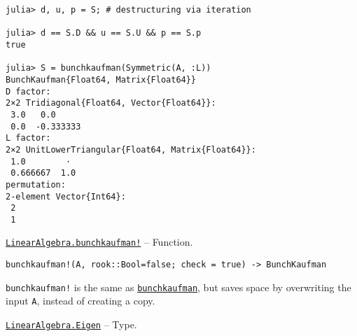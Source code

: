 \begin{adjustwidth}{2em}{0pt}
\begin{verbatim}
julia> d, u, p = S; # destructuring via iteration

julia> d == S.D && u == S.U && p == S.p
true

julia> S = bunchkaufman(Symmetric(A, :L))
BunchKaufman{Float64, Matrix{Float64}}
D factor:
2×2 Tridiagonal{Float64, Vector{Float64}}:
 3.0   0.0
 0.0  -0.333333
L factor:
2×2 UnitLowerTriangular{Float64, Matrix{Float64}}:
 1.0        ⋅
 0.666667  1.0
permutation:
2-element Vector{Int64}:
 2
 1
\end{verbatim}



\end{adjustwidth}
\hypertarget{12377977453211508613}{}
\hyperlink{12377977453211508613}{\texttt{LinearAlgebra.bunchkaufman!}}  -- {Function.}

\begin{adjustwidth}{2em}{0pt}


\begin{verbatim}
bunchkaufman!(A, rook::Bool=false; check = true) -> BunchKaufman
\end{verbatim}

\texttt{bunchkaufman!} is the same as \hyperlink{17253210517333433448}{\texttt{bunchkaufman}}, but saves space by overwriting the input \texttt{A}, instead of creating a copy.



\end{adjustwidth}
\hypertarget{2476442734611677039}{}
\hyperlink{2476442734611677039}{\texttt{LinearAlgebra.Eigen}}  -- {Type.}

